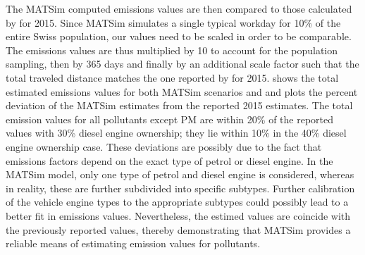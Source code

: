 The MATSim computed emissions values are then compared to those calculated by \citet{foen2010pollutants} for 2015.
Since MATSim simulates a single typical workday for 10\% of the entire Swiss population, our values need to be scaled in order to be comparable.
The emissions values are thus multiplied by 10 to account for the population sampling, then by 365 days and finally by an additional scale factor such that the total traveled distance matches the one reported by \citet{foen2010pollutants} for 2015.
 shows the total estimated emissions values for both MATSim scenarios and \citet{foen2010pollutants} and  plots the percent deviation of the MATSim estimates from the reported 2015 estimates.
The total emission values for all pollutants except PM are within 20\% of the reported values with 30\% diesel engine ownership; they lie within 10\% in the 40\% diesel engine ownership case.
These deviations are possibly due to the fact that emissions factors depend on the exact type of petrol or diesel engine.
In the MATSim model, only one type of petrol and diesel engine is considered, whereas in reality, these are further subdivided into specific subtypes.
Further calibration of the vehicle engine types to the appropriate subtypes could possibly lead to a better fit in emissions values.
Nevertheless, the estimed values are coincide with the previously reported values, thereby demonstrating that MATSim provides a reliable means of estimating emission values for pollutants.


